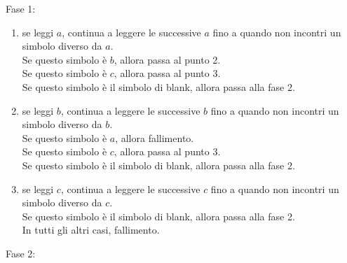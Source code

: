 Fase 1:
\begin{enumerate}
    \item se leggi $a$, continua a leggere le successive $a$
    fino a quando non incontri un simbolo diverso da $a$.\\
    Se questo simbolo è $b$, allora passa al punto 2.\\
    Se questo simbolo è $c$, allora passa al punto 3.\\
    Se questo simbolo è il simbolo di blank, allora passa alla fase 2.
    \item se leggi $b$, continua a leggere le successive $b$ fino a quando non incontri un simbolo diverso da $b$.\\
    Se questo simbolo è $a$, allora fallimento.\\
    Se questo simbolo è $c$, allora passa al punto 3.\\
    Se questo simbolo è il simbolo di blank, allora passa alla fase 2.
    \item se leggi $c$, continua a leggere le successive $c$ fino a quando non incontri un simbolo diverso da $c$.\\
    Se questo simbolo è il simbolo di blank, allora passa alla fase 2.\\
    In tutti gli altri casi, fallimento.
\end{enumerate}
Fase 2:
